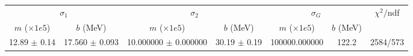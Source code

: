 \begin{tabular}{cc|cc|cc||c}
\multicolumn{2}{c|}{$\sigma_1$} & \multicolumn{2}{|c}{$\sigma_2$} & \multicolumn{2}{|c}{$\sigma_G$}  & \multirow{2}{*}{$\chi^2/$ndf}\\
$m$ ($\times1e5$) & $b$ (MeV) & $m$ ($\times1e5$) & $b$ (MeV) & $m$ ($\times1e5$) & $b$ (MeV) & \\
\hline
12.89 $\pm$ 0.14 & 17.560 $\pm$ 0.093 & 10.000000 $\pm$ 0.000000 & 30.19 $\pm$ 0.19 & 100000.000000 & 122.2 & 2584/573\\
\end{tabular}
